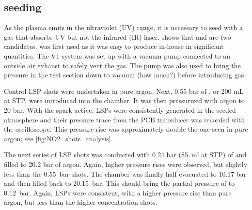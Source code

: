             


            \subsection{ seeding}

            
            As the plasma emits in the ultraviolet (UV) range, it is necessary to seed with a gas that absorbs UV but not the infrared (IR) laser. \textcite{khanGasDetectionUsing2019} shows that  and  are two candidates.  was first used as it was easy to produce in-house in significant quantities. The V1 system was set up with a vacuum pump connected to an outside air exhaust to safely vent the  gas. The pump was also used to bring the pressure in the test section down to vacuum (how much?) before introducing gas.


            Control LSP shots were undertaken in pure argon. Next, 0.55 bar of , or 200 mL at STP, were introduced into the chamber. It was then pressurized with argon to 20 bar. With the spark active, LSPs were consistently generated in the seeded atmosphere and their pressure trace from the PCB transducer was recorded with the oscilloscope. This pressure rise was approximately double the one seen in pure argon; see \autoref{fig:NO2_shots_analysis}.

            The next series of LSP shots was conducted with 0.24 bar (\qty{85}{ml} at STP) of  and filled to 20.2 bar of argon. Again, higher pressure rises were observed, but slightly less than the \qty{0.55}{bar} shots. The chamber was finally half evacuated to 10.17 bar and then filled back to \qty{20.15}{bar}. This should bring the partial pressure of  to \qty{0.12}{bar}. Again, LSPs were consistent, with a higher pressure rise than pure argon, but less than the higher concentration  shots.

